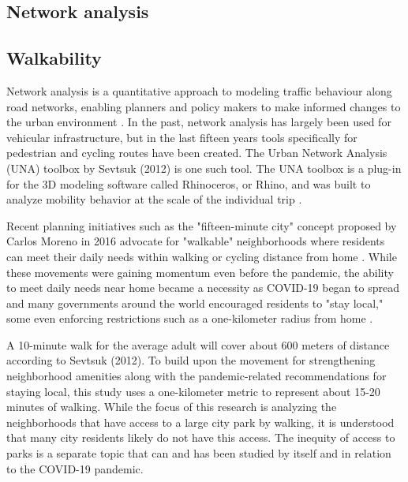\begin{multicols}{2}

\section{Network analysis}
\subsection{Walkability}
Network analysis is a quantitative approach to modeling traffic behaviour along road networks, enabling planners and policy makers to make informed changes to the urban environment \cite{sevtsuk_urban_2012}. In the past, network analysis has largely been used for vehicular infrastructure, but in the last fifteen years tools specifically for pedestrian and cycling routes have been created. The Urban Network Analysis (UNA) toolbox by Sevtsuk (2012) is one such tool. The UNA toolbox is a plug-in for the 3D modeling software called Rhinoceros, or Rhino, and was built to analyze mobility behavior at the scale of the individual trip \cite{sevtsuk_urban_2012}. 

Recent planning initiatives such as the "fifteen-minute city" concept proposed by Carlos Moreno in 2016 advocate for "walkable" neighborhoods where residents can meet their daily needs within walking or cycling distance from home \cite{moreno_introducing_2021}. While these movements were gaining momentum even before the pandemic, the ability to meet daily needs near home became a necessity as COVID-19 began to spread and many governments around the world encouraged residents to "stay local," some even enforcing restrictions such as a one-kilometer radius from home \cite{lotfata_changing_2022}\cite{habibullah_one-kilometer_2022}. 

A 10-minute walk for the average adult will cover about 600 meters of distance according to Sevtsuk (2012)\cite{sevtsuk_urban_2012}. To build upon the movement for strengthening neighborhood amenities along with the pandemic-related recommendations for staying local, this study uses a one-kilometer metric to represent about 15-20 minutes of walking. While the focus of this research is analyzing the neighborhoods that have access to a large city park by walking, it is understood that many city residents likely do not have this access. The inequity of access to parks is a separate topic that can and has been studied by itself and in relation to the COVID-19 pandemic\cite{wolch_parks_2005}\cite{jones_equity_2009}\cite{pipitone_urban_2021}\cite{noauthor_park_nodate}.


\end{multicols}
